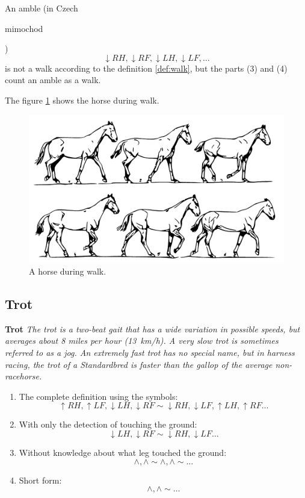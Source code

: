 \begin{remark}
    An amble (in Czech \begin{otherlanguage}{czech}mimochod\end{otherlanguage}) $$\downarrow RH, \downarrow RF, \downarrow LH, \downarrow LF, \dots$$ is not a walk according to the definition \ref{def:walk}, but the parts (3) and (4) count an amble as a walk.
\end{remark}

The figure \ref{fig:walk} shows the horse during walk.

\begin{figure}
	\centering
	\caption{A horse during walk. \cite{Duruttya2005}}
	\label{fig:walk}
	\includegraphics[width=\linewidth]{img/krok.pdf}
\end{figure}

\subsection{Trot}
\begin{definition}{\textbf{Trot}}
    \label{def:trot}
    \textit{The trot is a two-beat gait that has a wide variation in possible speeds, but averages about 8 miles per hour (\SI{13}{km/h}). A very slow trot is sometimes referred to as a jog. An extremely fast trot has no special name, but in harness racing, the trot of a Standardbred is faster than the gallop of the average non-racehorse.} \cite{Harrisc1993}
    
    \begin{enumerate}
        \item The complete definition using the symbols:
        $$ \uparrow RH, \uparrow LF, \downarrow LH, \downarrow RF \sim \downarrow RH, \downarrow LF, \uparrow LH, \uparrow RF \dots $$
        \item With only the detection of touching the ground:
        $$ \downarrow LH, \downarrow RF \sim \downarrow RH, \downarrow LF \dots $$
        \item Without knowledge about what leg touched the ground:
        $$ \wedge, \wedge \sim \wedge, \wedge \sim \dots $$
        \item Short form:
        $$ \wedge, \wedge \sim \dots $$
    \end{enumerate}
\end{definition}

